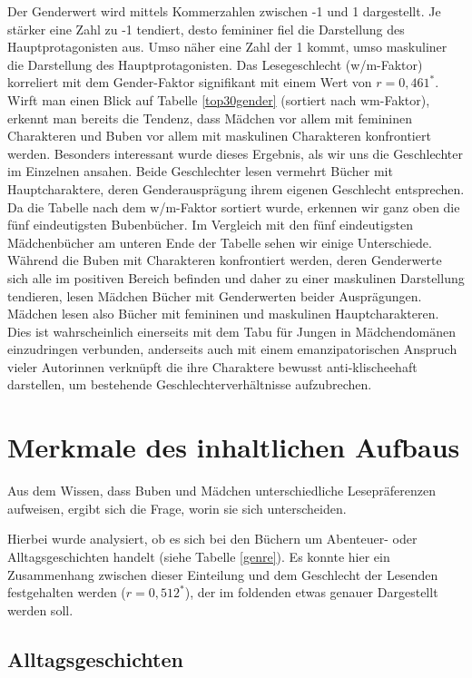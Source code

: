 Der Genderwert wird mittels Kommerzahlen zwischen -1 und 1 dargestellt.
Je stärker eine Zahl zu -1 tendiert, desto femininer fiel die
Darstellung des Hauptprotagonisten aus. Umso näher eine Zahl der 1
kommt, umso maskuliner die Darstellung des Hauptprotagonisten. Das
Lesegeschlecht (w/m-Faktor) korreliert mit dem Gender-Faktor signifikant
mit einem Wert von $r= 0{,}461^*$. Wirft man einen Blick auf Tabelle
\ref{top30gender} (sortiert nach wm-Faktor), erkennt man bereits die
Tendenz, dass Mädchen vor allem mit femininen Charakteren und Buben vor
allem mit maskulinen Charakteren konfrontiert werden. Besonders
interessant wurde dieses Ergebnis, als wir uns die Geschlechter im
Einzelnen ansahen. Beide Geschlechter lesen vermehrt Bücher mit
Hauptcharaktere, deren Genderausprägung ihrem eigenen Geschlecht
entsprechen. Da die Tabelle nach dem w/m-Faktor sortiert wurde, erkennen
wir ganz oben die fünf eindeutigsten Bubenbücher. Im Vergleich mit den
fünf eindeutigsten Mädchenbücher am unteren Ende der Tabelle sehen wir
einige Unterschiede. Während die Buben mit Charakteren konfrontiert
werden, deren Genderwerte sich alle im positiven Bereich befinden und
daher zu einer maskulinen Darstellung tendieren, lesen Mädchen Bücher
mit Genderwerten beider Ausprägungen. Mädchen lesen also Bücher mit
femininen und maskulinen Hauptcharakteren. Dies ist wahrscheinlich
einerseits mit dem Tabu für Jungen in Mädchendomänen einzudringen
verbunden, anderseits auch mit einem emanzipatorischen Anspruch vieler
Autorinnen verknüpft die ihre Charaktere bewusst anti-klischeehaft
darstellen, um bestehende Geschlechterverhältnisse aufzubrechen.



\section{Merkmale des inhaltlichen Aufbaus}

Aus dem Wissen, dass Buben und Mädchen unterschiedliche Lesepräferenzen
aufweisen, ergibt sich die Frage, worin sie sich unterscheiden.

Hierbei wurde analysiert, ob es sich bei den Büchern um Abenteuer- oder
Alltagsgeschichten handelt (siehe Tabelle \ref{genre}). Es konnte hier
ein Zusammenhang zwischen dieser Einteilung und dem Geschlecht der
Lesenden festgehalten werden ($r= 0{,}512^*$), der im foldenden etwas
genauer Dargestellt werden soll.



\subsection{Alltagsgeschichten}

